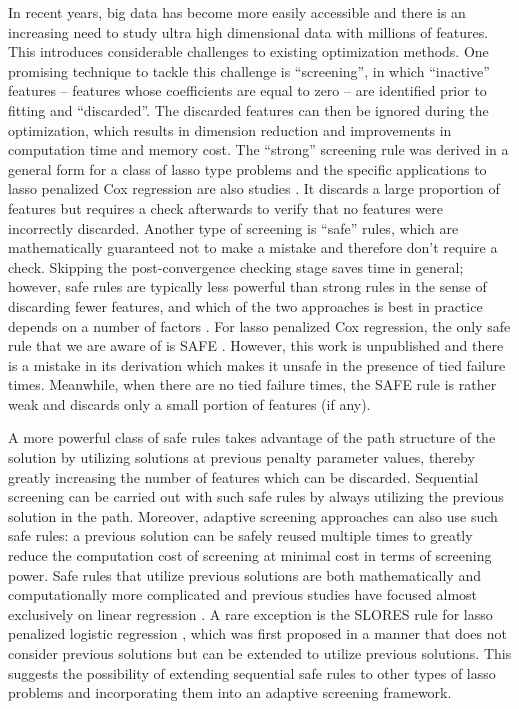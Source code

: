 In recent years, big data has become more easily accessible and there is an increasing need to study ultra high dimensional data with millions of features. This introduces considerable challenges to existing optimization methods. One promising technique to tackle this challenge is ``screening'', in which ``inactive'' features -- features whose coefficients are equal to zero -- are identified prior to fitting and ``discarded''. The discarded features can then be ignored during the optimization, which results in dimension reduction and improvements in computation time and memory cost. The ``strong'' screening rule \citep{Tibshirani2012} was derived in a general form for a class of lasso type problems and the specific applications to lasso penalized Cox regression are also studies \citep{simon2011regularization,yang2013}. It discards a large proportion of features but requires a check afterwards to verify that no features were incorrectly discarded. Another type of screening is ``safe'' rules, which are mathematically guaranteed not to make a mistake and therefore don't require a check. Skipping the post-convergence checking stage saves time in general; however, safe rules are typically less powerful than strong rules in the sense of discarding fewer features, and which of the two approaches is best in practice depends on a number of factors . For lasso penalized Cox regression, the only safe rule that we are aware of is SAFE \citep{ko2017solving}. However, this work is unpublished and there is a mistake in its derivation which makes it unsafe in the presence of tied failure times. Meanwhile, when there are no tied failure times, the SAFE rule is rather weak and discards only a small portion of features (if any).

A more powerful class of safe rules takes advantage of the path structure of the solution by utilizing solutions at previous penalty parameter values, thereby greatly increasing the number of features which can be discarded. Sequential screening can be carried out with such safe rules by always utilizing the previous solution in the path. Moreover, adaptive screening approaches \citep{wang2021adaptive} can also use such safe rules: a previous solution can be safely reused multiple times to greatly reduce the computation cost of screening at minimal cost in terms of screening power. Safe rules that utilize previous solutions are both mathematically and computationally more complicated and previous studies have focused almost exclusively on linear regression \citep{wang2013lasso}. A rare exception is the SLORES rule for lasso penalized logistic regression \citep{wang2014safe}, which was first proposed in a manner that does not consider previous solutions but can be extended to utilize previous solutions. This suggests the possibility of extending sequential safe rules to other types of lasso problems and incorporating them into an adaptive screening framework.

